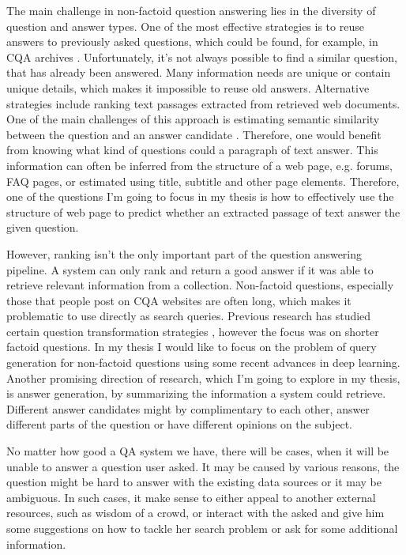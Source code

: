 The main challenge in non-factoid question answering lies in the diversity of question and answer types.
One of the most effective strategies is to reuse answers to previously asked questions, which could be found, for example, in CQA archives \cite{Shtok:2012:LPA:2187836.2187939}.
Unfortunately, it's not always possible to find a similar question, that has already been answered.
Many information needs are unique or contain unique details, which makes it impossible to reuse old answers.
Alternative strategies include ranking text passages extracted from retrieved web documents.
One of the main challenges of this approach is estimating semantic similarity between the question and an answer candidate \cite{soricut2006automatic}.
Therefore, one would benefit from knowing what kind of questions could a paragraph of text answer.
This information can often be inferred from the structure of a web page, e.g. forums, FAQ pages, or estimated using title, subtitle and other page elements.
Therefore, one of the questions I'm going to focus in my thesis is how to effectively use the structure of web page to predict whether an extracted passage of text answer the given question.

However, ranking isn't the only important part of the question answering pipeline.
A system can only rank and return a good answer if it was able to retrieve relevant information from a collection.
Non-factoid questions, especially those that people post on CQA websites are often long, which makes it problematic to use directly as search queries.
Previous research has studied certain question transformation strategies \cite{AgichteinLG01,brill_askmsr,lin2003question}, however the focus was on shorter factoid questions.
In my thesis I would like to focus on the problem of query generation for non-factoid questions using some recent advances in deep learning.
Another promising direction of research, which I'm going to explore in my thesis, is answer generation, \ie by summarizing the information a system could retrieve.
Different answer candidates might by complimentary to each other, answer different parts of the question or have different opinions on the subject.

No matter how good a QA system we have, there will be cases, when it will be unable to answer a question user asked.
It may be caused by various reasons, \eg the question might be hard to answer with the existing data sources or it may be ambiguous.
In such cases, it make sense to either appeal to another external resources, \eg such as wisdom of a crowd, or interact with the asked and give him some suggestions on how to tackle her search problem or ask for some additional information.


